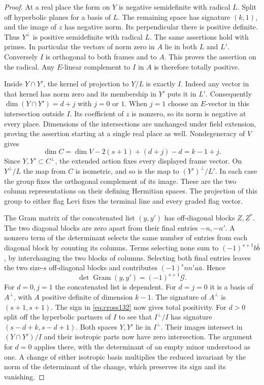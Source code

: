 \documentclass[a4paper,11pt]{article}
\theoremstyle{definition}
\theoremstyle{remark}
\numberwithin{equation}{section}
\begin{document}
\begin{proof}
At a real place the form on \(Y\) is negative semidefinite with
radical \(L\). Split off hyperbolic planes for a basis of \(L\).
The remaining space has signature \((k,1)\), and the image of
\(z\) has negative norm. Its perpendicular there is positive
definite. Thus \(Y^\perp\) is positive semidefinite with radical
\(L\). The same assertions hold with primes. In particular the
vectors of norm zero in \(A\) lie in both \(L\) and \(L'\).
Conversely \(I\) is orthogonal to both frames and to \(A\). This
proves the assertion on the radical. Any \(E\)-linear complement
to \(I\) in \(A\) is therefore totally positive.

Inside \(Y\cap Y'\), the kernel of projection to \(Y/L\) is
exactly \(I\). Indeed any vector in that kernel has norm zero
and its membership in \(Y'\) puts it in \(L'\). Consequently
\(\dim(Y\cap Y')=d+j\) with \(j=0\) or \(1\). When \(j=1\)
choose an \(E\)-vector in this intersection outside \(I\).
Its coefficient of \(z\) is nonzero, so its norm is negative
at every place. Dimensions of the intersections are unchanged
under field extension, proving the assertion starting at a single
real place as well. Nondegeneracy of \(V\) gives
\[
    \dim C=\dim V-2(s+1)+(d+j)-d=k-1+j .
\]
Since \(Y,Y'\subset C^\perp\), the extended action fixes every
displayed frame vector. On \(Y^\perp/L\) the map from \(C\) is
isometric, and so is the map to \((Y')^\perp/L'\).
In each case the group fixes the orthogonal complement of its
image. These are the two column representations on their defining
Hermitian spaces. The projection of this group to either flag
Levi fixes the terminal line and every graded flag vector.

The Gram matrix of the concatenated list \((y,y')\) has off-diagonal
blocks \(Z,Z^*\). The two diagonal blocks are zero apart from
their final entries \(-n,-n'\). A nonzero term of the determinant
selects the same number of entries from each diagonal block by
counting its columns. Terms selecting none sum to
\((-1)^{s+1}b\bar b\), by interchanging the two blocks of columns.
Selecting both final entries leaves the two size-\(s\) off-diagonal
blocks and contributes \((-1)^snn'a\bar a\). Hence
\begin{equation}
       \det\operatorname{Gram}(y,y')=(-1)^{s+1}\mathcal G .
       \label{eq:cross132}
\end{equation}
For \(d=0,j=1\) the concatenated list is dependent. For \(d=j=0\)
it is a basis of \(A^\perp\), with \(A\) positive definite of
dimension \(k-1\). The signature of \(A^\perp\) is
\((s+1,s+1)\). The sign in \eqref{eq:cross132} now gives total
positivity. For \(d>0\) split off the hyperbolic partners of
\(I\) to see that \(I^\perp/I\) has signature
\((s-d+k,s-d+1)\). Both spaces \(Y,Y'\) lie in \(I^\perp\).
Their images intersect in \((Y\cap Y')/I\) and their isotropic
parts now have zero intersection. The argument for \(d=0\)
applies there, with the determinant of an empty minor understood
as one. A change of either isotropic basis multiplies the
reduced invariant by the norm of the determinant of the change,
which preserves its sign and its vanishing.
\end{proof}
\end{document}
